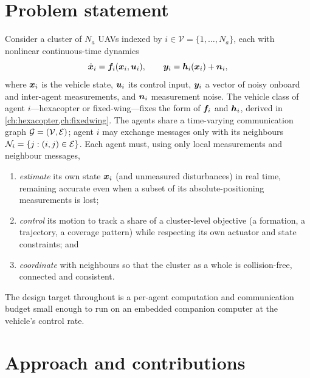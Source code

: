 \section{Problem statement}

Consider a cluster of $N_a$ UAVs indexed by $i\in\mathcal V=\{1,\dots,N_a\}$,
each with nonlinear continuous-time dynamics
\begin{equation}
\dot{\bm{x}}_i = \bm{f}_i(\bm{x}_i,\bm{u}_i), \qquad
\bm{y}_i = \bm{h}_i(\bm{x}_i) + \bm{n}_i,
\label{eq:agent-generic}
\end{equation}
where $\bm{x}_i$ is the vehicle state, $\bm{u}_i$ its control input, $\bm{y}_i$ a
vector of noisy onboard and inter-agent measurements, and $\bm{n}_i$ measurement
noise. The vehicle class of agent $i$---hexacopter or fixed-wing---fixes the
form of $\bm{f}_i$ and $\bm{h}_i$, derived in
\cref{ch:hexacopter,ch:fixedwing}. The agents share a time-varying communication
graph $\mathcal{G}=(\mathcal V,\mathcal E)$; agent $i$ may exchange messages only with
its neighbours $\mathcal{N}_i=\{j:(i,j)\in\mathcal E\}$. Each agent must, using only
local measurements and neighbour messages,
\begin{enumerate}[nosep,leftmargin=1.4em]
  \item \emph{estimate} its own state $\bm{x}_i$ (and unmeasured disturbances)
        in real time, remaining accurate even when a subset of its
        absolute-positioning measurements is lost;
  \item \emph{control} its motion to track a share of a cluster-level objective
        (a formation, a trajectory, a coverage pattern) while respecting its own
        actuator and state constraints; and
  \item \emph{coordinate} with neighbours so that the cluster as a whole is
        collision-free, connected and consistent.
\end{enumerate}
The design target throughout is a per-agent computation and communication budget
small enough to run on an embedded companion computer at the vehicle's control
rate.

\section{Approach and contributions}

